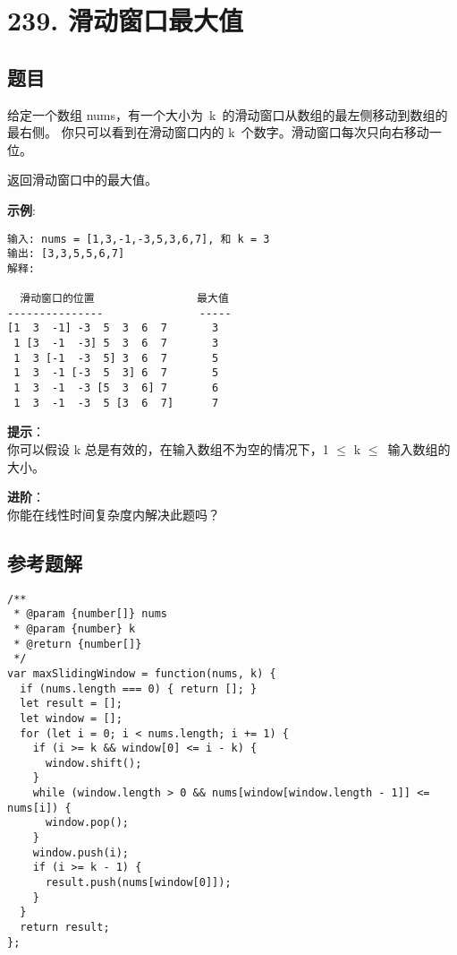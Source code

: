 \newpage
\section{239. 滑动窗口最大值}
\label{leetcode:239}

\subsection{题目}

给定一个数组 nums，有一个大小为 k 的滑动窗口从数组的最左侧移动到数组的最右侧。
你只可以看到在滑动窗口内的 k 个数字。滑动窗口每次只向右移动一位。

返回滑动窗口中的最大值。

\textbf{示例}:

\begin{verbatim}
输入: nums = [1,3,-1,-3,5,3,6,7], 和 k = 3
输出: [3,3,5,5,6,7] 
解释: 

  滑动窗口的位置                最大值
---------------               -----
[1  3  -1] -3  5  3  6  7       3
 1 [3  -1  -3] 5  3  6  7       3
 1  3 [-1  -3  5] 3  6  7       5
 1  3  -1 [-3  5  3] 6  7       5
 1  3  -1  -3 [5  3  6] 7       6
 1  3  -1  -3  5 [3  6  7]      7
\end{verbatim}

\textbf{提示}：\\
你可以假设 k 总是有效的，在输入数组不为空的情况下，1 $\leq$ k $\leq$ 输入数组的大小。

\textbf{进阶}：\\
你能在线性时间复杂度内解决此题吗？

\subsection{参考题解}

\begin{verbatim}
/**
 * @param {number[]} nums
 * @param {number} k
 * @return {number[]}
 */
var maxSlidingWindow = function(nums, k) {
  if (nums.length === 0) { return []; }
  let result = [];
  let window = [];
  for (let i = 0; i < nums.length; i += 1) {
    if (i >= k && window[0] <= i - k) {
      window.shift();
    }
    while (window.length > 0 && nums[window[window.length - 1]] <= nums[i]) {
      window.pop();
    }
    window.push(i);
    if (i >= k - 1) {
      result.push(nums[window[0]]);
    }
  }
  return result;
};
\end{verbatim}
